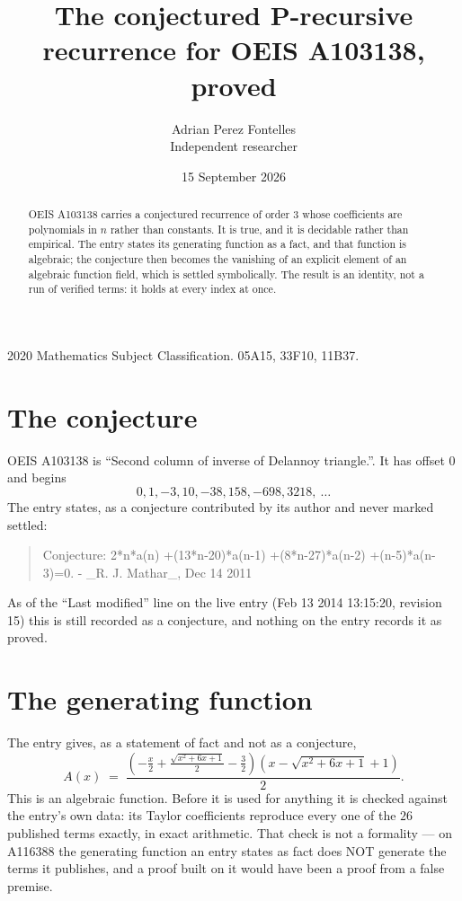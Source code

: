 \documentclass[11pt,a4paper]{article}
\title{The conjectured P-recursive recurrence for OEIS A103138, proved}
\author{Adrian Perez Fontelles\\ \small Independent researcher}
\date{15 September 2026}
\theoremstyle{plain}
\theoremstyle{definition}
\begin{document}
\maketitle

\begin{abstract}
OEIS A103138 carries a conjectured recurrence of order $3$ whose coefficients are polynomials in
$n$ rather than constants. It is true, and it is decidable rather than empirical. The entry
states its generating function as a fact, and that function is algebraic; the conjecture then
becomes the vanishing of an explicit element of an algebraic function field, which is settled
symbolically. The result is an identity, not a run of verified terms: it holds at every index
at once.
\end{abstract}

\noindent\small 2020 Mathematics Subject Classification. 05A15, 33F10, 11B37.\normalsize

\section{The conjecture}

OEIS A103138 is ``Second column of inverse of Delannoy triangle.''. It has offset $0$ and begins
\[
0, 1, -3, 10, -38, 158, -698, 3218,\ \dots
\]
The entry states, as a conjecture contributed by its author and never marked settled:
\begin{quote}\raggedright\small
Conjecture: 2*n*a(n) +(13*n-20)*a(n-1) +(8*n-27)*a(n-2) +(n-5)*a(n-3)=0. - \_R. J. Mathar\_, Dec 14 2011
\end{quote}
As of the ``Last modified'' line on the live entry (Feb 13 2014 13:15:20, revision 15)
this is still recorded as a conjecture, and nothing on the entry records it as proved.

\section{The generating function}

The entry gives, as a statement of fact and not as a conjecture,
\[
A(x)\;=\;\frac{\left(- \frac{x}{2} + \frac{\sqrt{x^{2} + 6 x + 1}}{2} - \frac{3}{2}\right) \left(x - \sqrt{x^{2} + 6 x + 1} + 1\right)}{2} .
\]
This is an algebraic function. Before it is used for anything it is checked against the entry's
own data: its Taylor coefficients reproduce every one of the $26$ published terms
exactly, in exact arithmetic. That check is not a formality --- on A116388 the generating
function an entry states as fact does NOT generate the terms it publishes, and a proof built on
it would have been a proof from a false premise.
\end{document}
